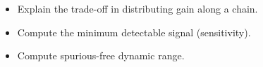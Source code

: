 \begin{objectives}
\begin{itemize}[leftmargin=1.4em,itemsep=2pt]
\item Explain the trade-off in distributing gain along a chain.
\item Compute the minimum detectable signal (sensitivity).
\item Compute spurious-free dynamic range.
\end{itemize}
\end{objectives}
